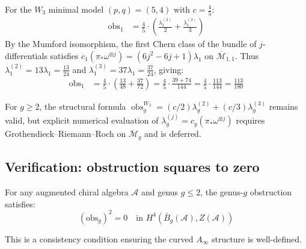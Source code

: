 \begin{computation}\label{comp:w3-obs-explicit}

For the $W_3$ minimal model $(p,q) = (5,4)$ with $c = \frac{4}{5}$:
\begin{align}
\text{obs}_1 &= \frac{4}{5} \cdot \left(\frac{\lambda_1^{(2)}}{2} +
\frac{\lambda_1^{(3)}}{3}\right)
\end{align}
By the Mumford isomorphism, the first Chern class of the bundle of $j$-differentials satisfies $c_1(\pi_* \omega^{\otimes j}) = (6j^2 - 6j + 1)\lambda_1$ on $\overline{\mathcal{M}}_{1,1}$.  Thus $\lambda_1^{(2)} = 13\lambda_1 = \frac{13}{24}$ and $\lambda_1^{(3)} = 37\lambda_1 = \frac{37}{24}$, giving:
\begin{align}
\text{obs}_1 &= \frac{4}{5} \cdot \left(\frac{13}{48} + \frac{37}{72}\right)
= \frac{4}{5} \cdot \frac{39 + 74}{144}
= \frac{4}{5} \cdot \frac{113}{144}
= \frac{113}{180}
\end{align}

For $g \geq 2$, the structural formula $\operatorname{obs}_g^{W_3} = (c/2)\lambda_g^{(2)} + (c/3)\lambda_g^{(3)}$ remains valid, but explicit numerical evaluation of $\lambda_g^{(j)} = c_g(\pi_* \omega^{\otimes j})$ requires Grothendieck--Riemann--Roch on $\overline{\mathcal{M}}_g$ and is deferred.
\end{computation}

\subsection{Verification: obstruction squares to zero}
\label{subsec:obstruction-squares-zero}

\begin{theorem}[Nilpotence of obstruction (\texorpdfstring{$g \leq 2$}{g <= 2}); \ClaimStatusProvedHere]\label{thm:obstruction-nilpotent}
For any augmented chiral algebra $\mathcal{A}$ and genus $g \leq 2$, the genus-$g$ obstruction satisfies:
\begin{equation}
(\text{obs}_g)^2 = 0 \quad \text{in } H^4(\bar{B}_g(\mathcal{A}), Z(\mathcal{A}))
\end{equation}

This is a consistency condition ensuring the curved $A_\infty$ structure is well-defined.
\end{theorem}

